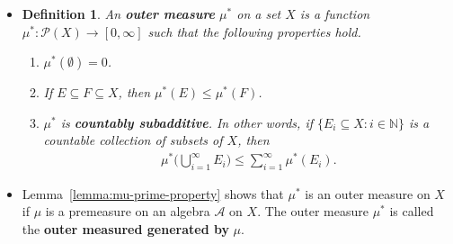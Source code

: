 \documentclass[10pt]{article}
\newtheorem{definition}[lemma]{Definition}
\newcommand{\mcal}[1]{\mathcal{#1}}
\begin{document}
\begin{itemize}
\begin{proof}
    For (d), let $A \in \mcal{A}$. We have that $\{A, \emptyset, \emptyset, \dotsc)$ is a cover of $A$. As a result,
    \begin{align*}
      \mu^*(A) \leq \mu(A) + \mu(\emptyset) + \mu(\emptyset) + \dotsb = \mu(A).
    \end{align*}
    Let $(E_j)$ be a cover of $A$. We have that $A = \bigcup (A \cap E_j)$. Because $\mu$ is a measure,
    \begin{align*}
      \mu(A) \leq \sum_{j=1}^\infty \mu(A \cap E_j) \leq \sum_{j=1}^\infty \mu(E_j).
    \end{align*}
    It follows that $\mu(A) \leq \inf\{ \sum \mu(E_j) : (E_j) \in \mathfrak{C}(A) \} = \mu^*(A)$. Hence, $\mu(A) = \mu^*(A)$.

    For (e), let $\varepsilon > 0$ be arbitrary. For each $n$, apply Lemma~\ref{lemma:epsilon-cover} to choose a sequence $(E_{nk})$ of sets in $\mcal{A}$ such that $(E_{nk})$ covers $B_n$ and
    \begin{align*}
      \sum_{k=1}^\infty \mu(E_{nk}) \leq \mu^*(B_n) + \frac{\varepsilon}{2^n}.
    \end{align*}
    Since $\{ E_{nk}: n, k \in \mathbb{N} \}$ is a countable collection from $\mcal{A}$ whose union contains $\bigcup B_n$, it follows that
    \begin{align*}
      \mu^*\bigg( \bigcup_{n=1}^\infty B_n \bigg)
      \leq \sum_{n=1}^\infty \sum_{k=1}^\infty \mu(E_{nk}) \leq \varepsilon + \sum_{k=1}^\infty \mu^*(B_n).
    \end{align*}
    Since $\varepsilon$ can be arbitrarily small, we have that Property (e) holds.
  \end{proof}

  \item \begin{definition}
    An {\bf outer measure} $\mu^*$ on a set $X$ is a function $\mu^*: \mcal{P}(X) \rightarrow [0,\infty]$ such that the following properties hold.
    \begin{enumerate}
      \item $\mu^*(\emptyset) = 0$.
      \item If $E \subseteq F \subseteq X$, then $\mu^*(E) \leq \mu^*(F)$.
      \item $\mu^*$ is {\bf countably subadditive}. In other words, if $\{ E_i \subseteq X : i \in \mathbb{N} \}$ is a countable collection of subsets of $X$, then
      \begin{align*}
          \mu^*\bigg( \bigcup_{i=1}^\infty E_i \bigg) \leq \sum_{i=1}^\infty \mu^*(E_i).
      \end{align*}
    \end{enumerate}
  \end{definition}

  \item Lemma~\ref{lemma:mu-prime-property} shows that $\mu^*$ is an outer measure on $X$ if $\mu$ is a premeasure on an algebra $\mcal{A}$ on $X$. The outer measure $\mu^*$ is called the {\bf outer measured generated by} $\mu$.  
\end{itemize}
\end{document}
